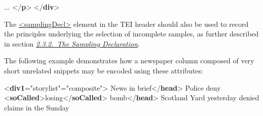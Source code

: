 \begin{shaded}
\mbox{}\newline 
{} ... {</\textbf{p}>}\mbox{}\newline 
{</\textbf{div}>}\end{shaded}\egroup\par \noindent  The \hyperref[TEI.samplingDecl]{<samplingDecl>} element in the TEI header should also be used to record the principles underlying the selection of incomplete samples, as further described in section \textit{\hyperref[HD52]{2.3.2.\ The Sampling Declaration}}.\par
The following example demonstrates how a newspaper column composed of very short unrelated snippets may be encoded using these attributes: \par\bgroup{}\exampleFont \begin{shaded}\noindent\mbox{}{<\textbf{div1}\hspace*{1em}{type}="{storylist}"\hspace*{1em}{org}="{composite}">}\mbox{}\newline 
{}News in brief{</\textbf{head}>}\mbox{}\newline 
{}\mbox{}\newline 
\hspace*{1em}Police deny {<\textbf{soCalled}>}losing{</\textbf{soCalled}>} bomb{</\textbf{head}>}\mbox{}\newline 
\hspace*{1em}Scotland Yard yesterday denied claims in the Sunday\mbox{}\newline 

\end{shaded}
